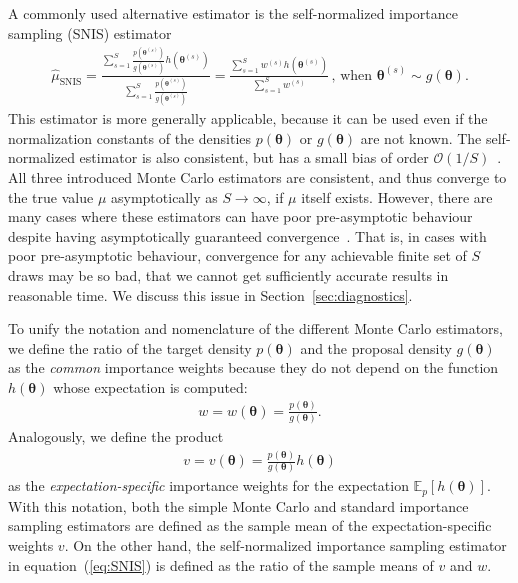 \documentclass[12pt]{article}
\newcommand{\ome}{v}
\newenvironment{nalign}{
    \begin{equation}
    \begin{aligned}
}{
    \end{aligned}
    \end{equation}
    \ignorespacesafterend
}
\begin{document}
%
%
%
%
%
%
%
%
A commonly used alternative estimator is the self-normalized importance sampling (SNIS) estimator
\begin{nalign} \label{eq:SNIS}
\hat{\mu}_{\text{SNIS}} =  \frac{ \sum_{s = 1}^S \frac{ p (\boldsymbol{\theta}^{(s)} )}{g (\boldsymbol{\theta}^{(s)})} h (\boldsymbol{\theta}^{(s)})}{\sum_{s = 1}^S \frac{ p (\boldsymbol{\theta}^{(s)} )}{g (\boldsymbol{\theta}^{(s)})}} = \frac{ \sum_{s = 1}^S w^{(s)} h (\boldsymbol{\theta}^{(s)})}{\sum_{s = 1}^S w^{(s)}}  \, , \, \text{when} \,  \, \boldsymbol{\theta}^{(s)} \sim g (\boldsymbol{\theta}) .
\end{nalign}
This estimator is more generally applicable, because it can be used even if the normalization constants
of the densities $p(\boldsymbol{\theta})$ or $g(\boldsymbol{\theta})$ are not known.
The self-normalized estimator is also consistent, but has a small bias of order $\mathcal{O} (1/S)$~\citep{mcbook}.
%
%
%
%
%
%
All three introduced Monte Carlo estimators are consistent, and thus
converge to the true value $\mu$ asymptotically as $S \rightarrow \infty$, if $\mu$ itself exists. However, there are many cases where these estimators can have poor pre-asymptotic behaviour despite having
asymptotically guaranteed convergence~\citep{vehtari2015pareto}. That is, in cases with poor pre-asymptotic behaviour, convergence for any achievable finite set of $S$ draws may be so bad, that we cannot get sufficiently accurate results in reasonable time. We discuss this issue in Section~\ref{sec:diagnostics}.








%
To unify the notation and nomenclature of the different Monte Carlo estimators, we define
the ratio of the target density $p (\boldsymbol{\theta} )$ and the proposal density $g (\boldsymbol{\theta} )$
%
%
as the \emph{common}
importance weights because they do not depend on the function $h (\boldsymbol{\theta} )$
whose expectation is computed:
\begin{nalign} \label{eq:commonw}
w = w(\boldsymbol{\theta}) =  \frac{p(\boldsymbol{\theta})}{g(\boldsymbol{\theta})}  .
\end{nalign}
Analogously, we define the product
\begin{nalign} \label{eq:intw}
\ome = \ome(\boldsymbol{\theta}) = \frac{p(\boldsymbol{\theta})}{g(\boldsymbol{\theta})} h(\boldsymbol{\theta})
\end{nalign}
as the \emph{expectation-specific} importance weights for the expectation $\mathbb{E}_p [h(\boldsymbol{\theta})]$.
With this notation, both the simple Monte Carlo and standard importance sampling estimators
are defined as the sample mean of the expectation-specific weights $\ome$.
On the other hand,
the self-normalized importance sampling
estimator in equation~(\ref{eq:SNIS}) is defined as the ratio of the sample means of $\ome $ and $w$.
\end{document}
